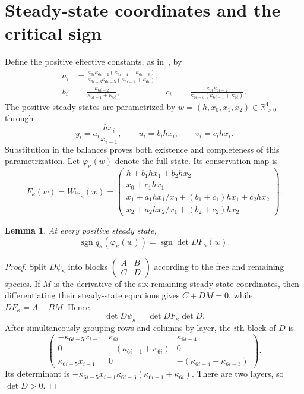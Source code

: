 \documentclass[11pt,a4paper]{article}
\numberwithin{equation}{section}
\newtheorem{lemma}[theorem]{Lemma}
\theoremstyle{remark}\newtheorem{remark}[theorem]{Remark}
\newcommand{\pos}{\mathbb{R}_{>0}}
\DeclareMathOperator{\sgn}{sgn}
\begin{document}
\section{Steady-state coordinates and the critical sign}\label{sec:critical}
Define the positive effective constants, as in~\cite[Eq.~(4)]{KW}, by
\begin{equation}\label{eq:effective}
\begin{aligned}
a_i&=\frac{\kappa_{6i}\kappa_{6i-2}(\kappa_{6i-4}+\kappa_{6i-3})}
 {\kappa_{6i-3}\kappa_{6i-5}(\kappa_{6i-1}+\kappa_{6i})},\\
b_i&=\frac{\kappa_{6i-2}}{\kappa_{6i-1}+\kappa_{6i}},&
c_i&=\frac{\kappa_{6i}\kappa_{6i-2}}{\kappa_{6i-3}(\kappa_{6i-1}+\kappa_{6i})}.
\end{aligned}
\end{equation}
The positive steady states are parametrized by $w=(h,x_0,x_1,x_2)\in\pos^4$ through
\begin{equation}\label{eq:steady}
y_i=a_i\frac{hx_i}{x_{i-1}},\qquad u_i=b_ihx_i,\qquad v_i=c_ihx_i.
\end{equation}
Substitution in the balances proves both existence and completeness of this parametrization. Let $\varphi_\kappa(w)$ denote the full state. Its conservation map is
\begin{equation}\label{eq:F}
F_\kappa(w)=W\varphi_\kappa(w)=
\begin{pmatrix}
h+b_1hx_1+b_2hx_2\\
x_0+c_1hx_1\\
x_1+a_1hx_1/x_0+(b_1+c_1)hx_1+c_2hx_2\\
x_2+a_2hx_2/x_1+(b_2+c_2)hx_2
\end{pmatrix}.
\end{equation}

\begin{lemma}\label{lem:sign}
At every positive steady state,
\[
\sgn q_\kappa(\varphi_\kappa(w))=\sgn\det DF_\kappa(w).
\]
\end{lemma}
\begin{proof}
Split $D\psi_\kappa$ into blocks $\left(\begin{smallmatrix}A&B\\C&D\end{smallmatrix}\right)$ according to the free and remaining species. If $M$ is the derivative of the six remaining steady-state coordinates, then differentiating their steady-state equations gives $C+DM=0$, while $DF_\kappa=A+BM$. Hence
\[
\det D\psi_\kappa=\det DF_\kappa\det D.
\]
After simultaneously grouping rows and columns by layer, the $i$th block of $D$ is
\[
\begin{pmatrix}
-\kappa_{6i-5}x_{i-1}&\kappa_{6i}&\kappa_{6i-4}\\
0&-(\kappa_{6i-1}+\kappa_{6i})&0\\
\kappa_{6i-5}x_{i-1}&0&-(\kappa_{6i-4}+\kappa_{6i-3})
\end{pmatrix}.
\]
Its determinant is $-\kappa_{6i-5}x_{i-1}\kappa_{6i-3}(\kappa_{6i-1}+\kappa_{6i})$. There are two layers, so $\det D>0$.
\end{proof}
\end{document}

